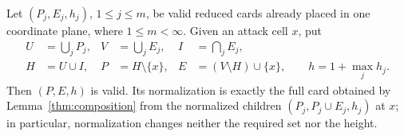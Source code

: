 \begin{proposition}\label{r25:composition}
Let $(P_j,E_j,h_j)$, $1\leq j\leq m$, be valid reduced cards already
placed in one coordinate plane, where $1\leq m<\infty$.  Given an
attack cell $x$, put
\begin{equation}\label{r25:reduced-rule}
 \begin{aligned}
 U&=\bigcup_jP_j,& V&=\bigcup_jE_j,& I&=\bigcap_jE_j,\\
 H&=U\cup I,& P&=H\setminus\{x\},&
 E&=(V\setminus H)\cup\{x\},\qquad
 h=1+\max_jh_j.
 \end{aligned}
\end{equation}
Then $(P,E,h)$ is valid.  Its normalization is exactly the full card
obtained by Lemma~\ref{thm:composition} from the normalized children
$(P_j,P_j\cup E_j,h_j)$ at $x$; in particular, normalization changes
neither the required set nor the height.
\end{proposition}

